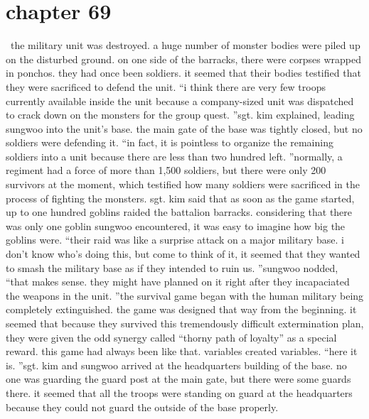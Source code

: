 \section{chapter 69}






 the military unit was destroyed.
a huge number of monster bodies were piled up on the disturbed ground.
 on one side of the barracks, there were corpses wrapped in ponchos.
 they had once been soldiers.
it seemed that their bodies testified that they were sacrificed to defend the unit.
“i think there are very few troops currently available inside the unit because a company-sized unit was dispatched to crack down on the monsters for the group quest.
”sgt.
 kim explained, leading sungwoo into the unit’s base.
 the main gate of the base was tightly closed, but no soldiers were defending it.
“in fact, it is pointless to organize the remaining soldiers into a unit because there are less than two hundred left.
”normally, a regiment had a force of more than 1,500 soldiers, but there were only 200 survivors at the moment, which testified how many soldiers were sacrificed in the process of fighting the monsters.
sgt.
 kim said that as soon as the game started, up to one hundred goblins raided the battalion barracks.
 considering that there was only one goblin sungwoo encountered, it was easy to imagine how big the goblins were.
“their raid was like a surprise attack on a major military base.
 i don’t know who’s doing this, but come to think of it, it seemed that they wanted to smash the military base as if they intended to ruin us.
”sungwoo nodded, “that makes sense.
 they might have planned on it right after they incapaciated the weapons in the unit.
”the survival game began with the human military being completely extinguished.
 the game was designed that way from the beginning.
it seemed that because they survived this tremendously difficult extermination plan, they were given the odd synergy called “thorny path of loyalty” as a special reward.
 this game had always been like that.
 variables created variables.
“here it is.
”sgt.
 kim and sungwoo arrived at the headquarters building of the base.
no one was guarding the guard post at the main gate, but there were some guards there.
it seemed that all the troops were standing on guard at the headquarters because they could not guard the outside of the base properly.

